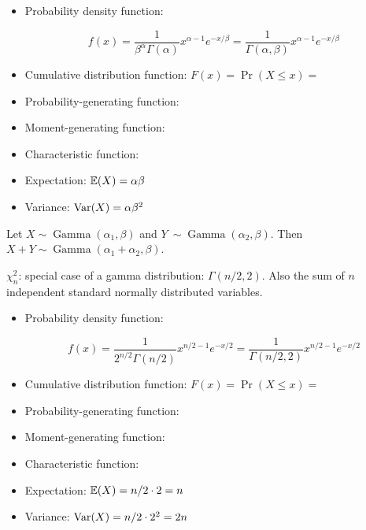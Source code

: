 \begin{itemize}

\item Probability density function: 

\[
f(x)  = \frac{1}{\beta^\alpha\Gamma(\alpha)} x^{\alpha - 1} e^{-x/\beta} = \frac{1}{\Gamma(\alpha, \beta)} x^{\alpha - 1} e^{-x/\beta}
\]

\item Cumulative distribution function: \(F(x) = \Pr(X \leq x) = \)

\item Probability-generating function:

\item Moment-generating function:

\item Characteristic function:

\item Expectation: \(\E(X) = \alpha \beta \)

\item Variance: \(\Var(X) = \alpha \beta^2 \)

\end{itemize}

\begin{proposition}\label{prob.gammasum}Let \(X \sim \operatorname{Gamma}(\alpha_1, \beta)\) and \(Y\ \sim \operatorname{Gamma}(\alpha_2, \beta)\). Then \(X + Y \sim \operatorname{Gamma}(\alpha_1 + \alpha_2, \beta)\). 
\end{proposition}

\textbf{\(\chi_n^2\)}: special case of a gamma distribution: \(\Gamma(n/2, 2)\). Also the sum of \(n\) independent standard normally distributed variables.

\begin{itemize}

\item Probability density function: 

\[
f(x)  = \frac{1}{2^{n/2}\Gamma(n/2)} x^{n/2 - 1} e^{-x/2} = \frac{1}{\Gamma(n/2, 2)} x^{n/2 - 1} e^{-x/2}
\]

\item Cumulative distribution function: \(F(x) = \Pr(X \leq x) = \)

\item Probability-generating function:

\item Moment-generating function:

\item Characteristic function:

\item Expectation: \(\E(X) = n/2 \cdot 2 = n \)

\item Variance: \(\Var(X) = n/2 \cdot 2^2 = 2n\)

\end{itemize}

